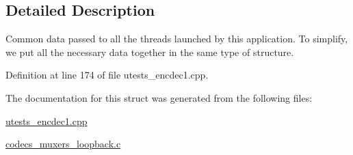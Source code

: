 \subsection{Detailed Description}
Common data passed to all the threads launched by this application. To simplify, we put all the necessary data together in the same type of structure. 

Definition at line 174 of file utests\+\_\+encdec1.\+cpp.



The documentation for this struct was generated from the following files\+:\begin{DoxyCompactItemize}
\item 
\hyperlink{utests__encdec1_8cpp}{utests\+\_\+encdec1.\+cpp}\item 
\hyperlink{codecs__muxers__loopback_8c}{codecs\+\_\+muxers\+\_\+loopback.\+c}\end{DoxyCompactItemize}
